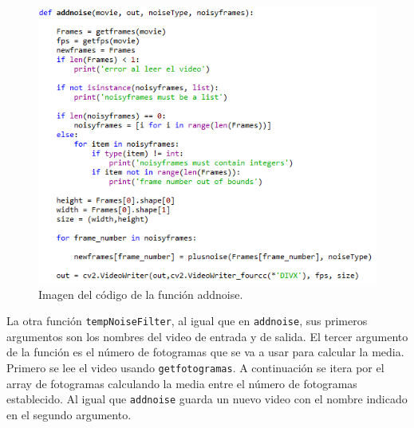 \begin{figure}[h]
\centering
\includegraphics[width=1.0\textwidth]{imagenes/addnoise}
\caption{Imagen del código de la función addnoise.}
\label{addnoise} 
\end{figure}

La otra función \texttt{tempNoiseFilter}, al igual que en \texttt{addnoise}, sus primeros argumentos son los nombres del video de entrada y de salida. El tercer argumento de la función es el número de fotogramas que se va a usar para calcular la media. Primero se lee el video usando \texttt{getfotogramas}. A continuación se itera por el array de fotogramas calculando la media entre el número de fotogramas establecido. Al igual que \texttt{addnoise} guarda un nuevo video con el nombre indicado en el segundo argumento.\\